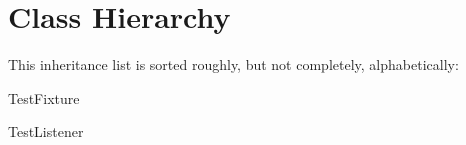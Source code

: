 \section{Class Hierarchy}
This inheritance list is sorted roughly, but not completely, alphabetically\+:\begin{DoxyCompactList}
\item {}
\begin{DoxyCompactList}
\item {}
\end{DoxyCompactList}
\item Test\+Fixture\begin{DoxyCompactList}
\item {}
\item {}
\end{DoxyCompactList}
\item Test\+Listener\begin{DoxyCompactList}
\item {}
\item {}
\end{DoxyCompactList}
\end{DoxyCompactList}
